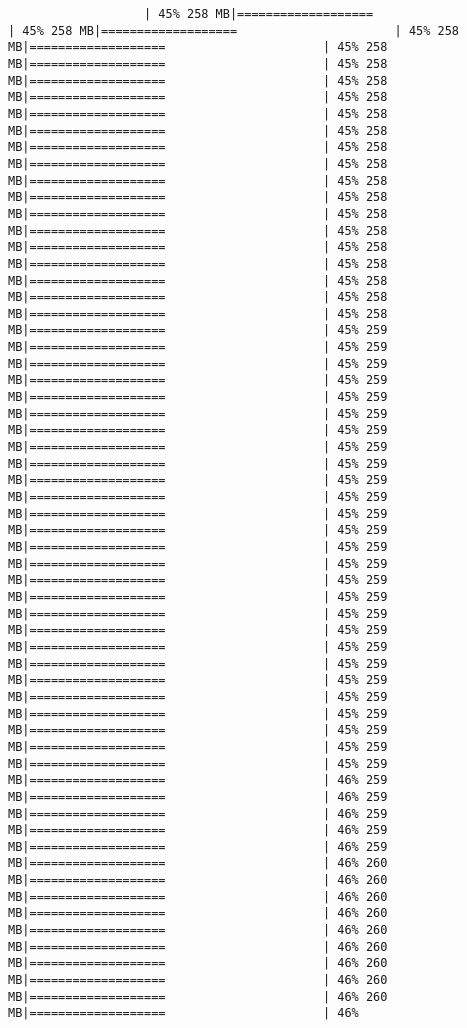 \documentclass[
]{article}
\begin{document}
\begin{verbatim}
                   | 45% 258 MB|===================                      | 45% 258 MB|===================                      | 45% 258 MB|===================                      | 45% 258 MB|===================                      | 45% 258 MB|===================                      | 45% 258 MB|===================                      | 45% 258 MB|===================                      | 45% 258 MB|===================                      | 45% 258 MB|===================                      | 45% 258 MB|===================                      | 45% 258 MB|===================                      | 45% 258 MB|===================                      | 45% 258 MB|===================                      | 45% 258 MB|===================                      | 45% 258 MB|===================                      | 45% 258 MB|===================                      | 45% 258 MB|===================                      | 45% 258 MB|===================                      | 45% 258 MB|===================                      | 45% 258 MB|===================                      | 45% 259 MB|===================                      | 45% 259 MB|===================                      | 45% 259 MB|===================                      | 45% 259 MB|===================                      | 45% 259 MB|===================                      | 45% 259 MB|===================                      | 45% 259 MB|===================                      | 45% 259 MB|===================                      | 45% 259 MB|===================                      | 45% 259 MB|===================                      | 45% 259 MB|===================                      | 45% 259 MB|===================                      | 45% 259 MB|===================                      | 45% 259 MB|===================                      | 45% 259 MB|===================                      | 45% 259 MB|===================                      | 45% 259 MB|===================                      | 45% 259 MB|===================                      | 45% 259 MB|===================                      | 45% 259 MB|===================                      | 45% 259 MB|===================                      | 45% 259 MB|===================                      | 45% 259 MB|===================                      | 45% 259 MB|===================                      | 45% 259 MB|===================                      | 45% 259 MB|===================                      | 45% 259 MB|===================                      | 46% 259 MB|===================                      | 46% 259 MB|===================                      | 46% 259 MB|===================                      | 46% 259 MB|===================                      | 46% 259 MB|===================                      | 46% 260 MB|===================                      | 46% 260 MB|===================                      | 46% 260 MB|===================                      | 46% 260 MB|===================                      | 46% 260 MB|===================                      | 46% 260 MB|===================                      | 46% 260 MB|===================                      | 46% 260 MB|===================                      | 46% 260 MB|===================                      | 46% 
\end{verbatim}
\end{document}
